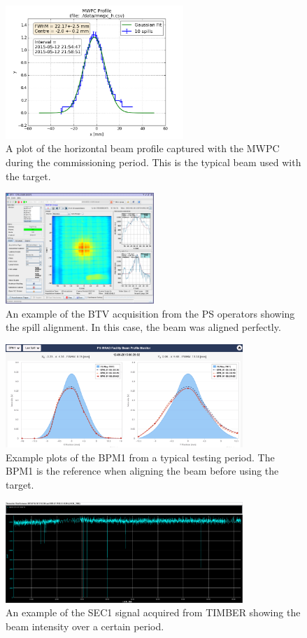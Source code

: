 \begin{figure}[!ht]
	\centering
	\includegraphics[width=0.6\textwidth]{./images/mwpc_com_10spills}
	\caption{A plot of the horizontal beam profile captured with the MWPC during the commissioning period. This is the typical beam used with the target.}
	\label{fig:mwpc_profile}
\end{figure}

\begin{figure}[!ht]
	\centering
	\includegraphics[width=0.5\textwidth]{./images/btv_example}
	\caption{An example of the BTV acquisition from the PS operators showing the spill alignment. In this case, the beam was aligned perfectly.}
	\label{fig:btv_example}
\end{figure}

\begin{figure}[!ht]
	\centering
	\includegraphics[width=0.8\textwidth]{./images/bpm_example}
	\caption{Example plots of the BPM1 from a typical testing period. The BPM1 is the reference when aligning the beam before using the target.}
	\label{fig:bpm_example}
\end{figure}

\begin{figure}[!ht]
	\centering
	\includegraphics[width=0.8\textwidth]{./images/sec1_example}
	\caption{An example of the SEC1 signal acquired from TIMBER showing the beam intensity over a certain period.}
	\label{fig:sec_example}
\end{figure}